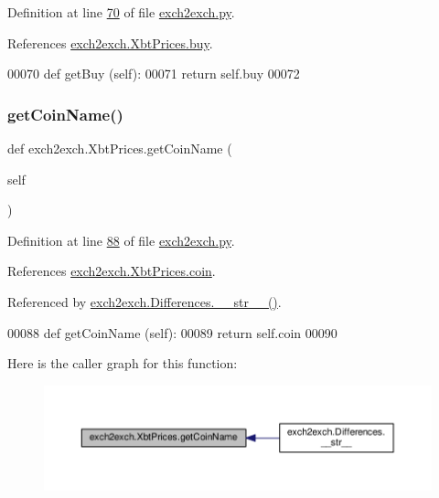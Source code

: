 Definition at line \hyperlink{exch2exch_8py_source_l00070}{70} of file \hyperlink{exch2exch_8py_source}{exch2exch.\+py}.



References \hyperlink{exch2exch_8py_source_l00059}{exch2exch.\+Xbt\+Prices.\+buy}.


\begin{DoxyCode}
00070     \textcolor{keyword}{def }getBuy (self):
00071         \textcolor{keywordflow}{return} self.buy
00072         
\end{DoxyCode}
\mbox{\label{classexch2exch_1_1_xbt_prices_acc3d7366d6093186bc7afe3d9364d7a9}} 
\subsubsection{\texorpdfstring{get\+Coin\+Name()}{getCoinName()}}
{\footnotesize\ttfamily def exch2exch.\+Xbt\+Prices.\+get\+Coin\+Name (\begin{DoxyParamCaption}\item[{}]{self }\end{DoxyParamCaption})}



Definition at line \hyperlink{exch2exch_8py_source_l00088}{88} of file \hyperlink{exch2exch_8py_source}{exch2exch.\+py}.



References \hyperlink{exch2exch_8py_source_l00065}{exch2exch.\+Xbt\+Prices.\+coin}.



Referenced by \hyperlink{exch2exch_8py_source_l00154}{exch2exch.\+Differences.\+\_\+\+\_\+str\+\_\+\+\_\+()}.


\begin{DoxyCode}
00088     \textcolor{keyword}{def }getCoinName (self):
00089         \textcolor{keywordflow}{return} self.coin
00090 
\end{DoxyCode}
Here is the caller graph for this function\+:
\nopagebreak
\begin{figure}[H]
\begin{center}
\leavevmode
\includegraphics[width=350pt]{classexch2exch_1_1_xbt_prices_acc3d7366d6093186bc7afe3d9364d7a9_icgraph}
\end{center}
\end{figure}
\mbox{\label{classexch2exch_1_1_xbt_prices_af683e90a9db529a99eef04c5141770ea}} 
